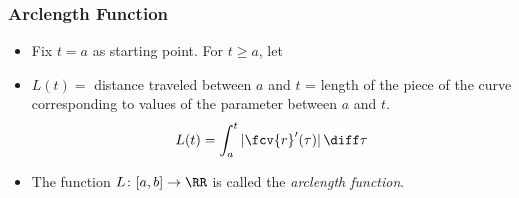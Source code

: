 \begin{frame}
\frametitle{Arclength Function}
\begin{itemize}
\item Fix $t=a$ as starting point. For $t \geqslant a$, let
\item $L(t) = $ distance traveled between $a$ and $t$ = length of the piece of the curve corresponding to values of the parameter between $a$ and $t$.
\[
L(t) =  \int_{a}^t |\fcv{r}'(\tau)| \, \diff \tau 
\]
\item<2-> The function $L\colon [a,b]\to \RR$ is called the \emph{arclength function}.
\end{itemize}

\end{frame}